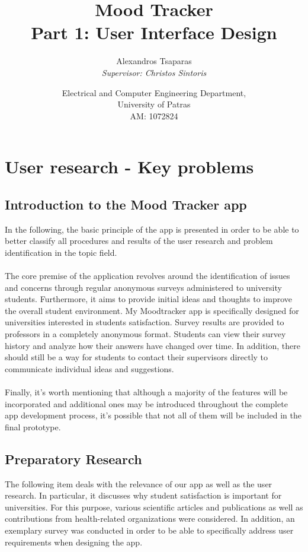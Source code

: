 \documentclass[11pt]{report}
\title{\Huge \textbf{Mood Tracker}\vspace{2mm} \\
    \large Part 1: User Interface Design}
\author{\vspace*{1cm}\Large Alexandros Tsaparas
\\ \textit{Supervisor: Christos Sintoris}
\and Electrical and Computer Engineering Department,
\\University of Patras\vspace{5mm} \\
AM: 1072824}
\date{}
\begin{document}
\maketitle 
\tableofcontents

\chapterfont{\LARGE \centering}
\chaptertitlefont{\Large \centering}
\chapter{User research - Key problems}

\section{Introduction to the Mood Tracker app}

In the following, the basic principle of the app is presented in order to be able to better classify all procedures and results of the user research and problem identification in the topic field.\\ \\
The core premise of the application revolves around the identification of issues and concerns through regular anonymous surveys administered to university students. Furthermore, it aims to provide initial ideas and thoughts to improve the overall student environment. My Moodtracker app is specifically designed for universities interested in students satisfaction. Survey results are provided to professors in a completely anonymous format. Students can view their survey history and analyze how their answers have changed over time. In addition, there should still be a way for students to contact their supervisors directly to communicate individual ideas and suggestions.\\ \\
Finally, it's worth mentioning that although a majority of the features will be incorporated and additional ones may be introduced throughout the complete app development process, it's possible that not all of them will be included in the final prototype.

\section{Preparatory Research}

The following item deals with the relevance of our app as well as the user research. In particular, it discusses why student satisfaction is important for universities. For this purpose, various scientific articles and publications as well as contributions from health-related organizations were considered. In addition, an exemplary survey was conducted in order to be able to specifically address user requirements when designing the app.
\end{document}
